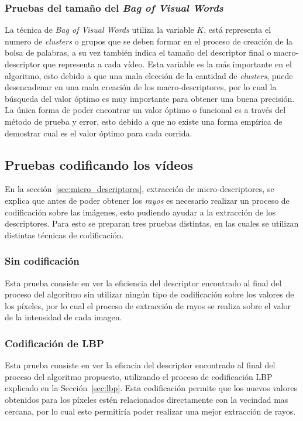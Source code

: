 \subsubsection{Pruebas del tamaño del \textit{Bag of Visual Words}}
La técnica de \textit{Bag of Visual Words} utiliza la variable $K$, está representa el numero de \textit{clusters} o grupos que se deben formar en el proceso de creación de la bolsa de palabras, a su vez también indica el tamaño del descriptor final o macro-descriptor que representa a cada vídeo. Esta variable es la  más importante en el algoritmo, esto debido a que una mala elección de la cantidad de \textit{clusters}, puede desencadenar en una mala creación de los macro-descriptores, por lo cual la búsqueda del valor óptimo es muy importante para obtener una buena precisión. La única forma de poder encontrar un valor óptimo o funcional es a través del método de prueba y error, esto debido a que no existe una forma empírica de demostrar cual es el valor óptimo para cada corrida.



\subsection{Pruebas codificando los vídeos}
\label{exp:cod}
En la sección~\ref{sec:micro_descriptores}, extracción de micro-descriptores, se explica que antes de poder obtener los \textit{rayos} es necesario realizar un proceso de codificación sobre las imágenes, esto pudiendo ayudar a la extracción de los descriptores. Para esto se preparan tres pruebas distintas, en las cuales se utilizan distintas técnicas de codificación.

	\subsubsection{Sin codificación}
	Esta prueba consiste en ver la eficiencia del descriptor encontrado al final del proceso del algoritmo sin utilizar ningún tipo de codificación sobre los valores de los píxeles, por lo cual el proceso de extracción de rayos se realiza sobre el valor de la intensidad de cada imagen.

	\subsubsection{Codificación de LBP}
	Esta prueba consiste en ver la eficacia del descriptor encontrado al final del proceso del algoritmo propuesto, utilizando el proceso de codificación LBP explicado en la Sección~\ref{sec:lbp}. Esta codificación permite que los nuevos valores obtenidos para los píxeles estén relacionados directamente con la vecindad mas cercana, por lo cual esto permitiría poder realizar una mejor extracción de rayos.
